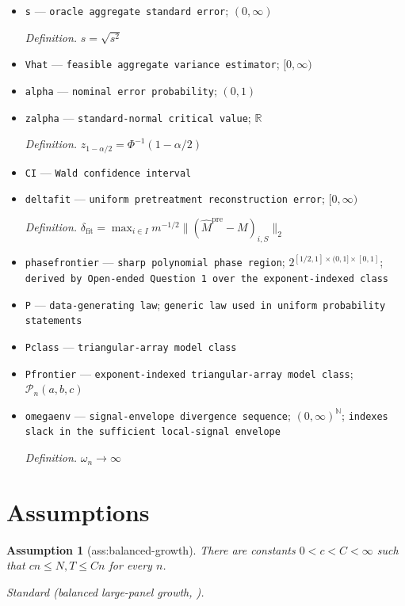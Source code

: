 \documentclass{article}
\newtheorem{assumption}{Assumption}
\begin{document}
\begin{itemize}
  \item \texttt{s} --- \texttt{oracle aggregate standard error}; \((0,\infty)\)
  \par\smallskip\noindent\emph{Definition.} \(s=\sqrt{s^2}\)
  \item \texttt{Vhat} --- \texttt{feasible aggregate variance estimator}; \([0,\infty)\)
  \item \texttt{alpha} --- \texttt{nominal error probability}; \((0,1)\)
  \item \texttt{zalpha} --- \texttt{standard-\allowbreak{}normal critical value}; \(\mathbb R\)
  \par\smallskip\noindent\emph{Definition.} \(z_{1-\alpha/2}=\Phi^{-1}(1-\alpha/2)\)
  \item \texttt{CI} --- \texttt{Wald confidence interval}
  \item \texttt{deltafit} --- \texttt{uniform pretreatment reconstruction error}; \([0,\infty)\)
  \par\smallskip\noindent\emph{Definition.} \(\delta_{\mathrm{fit}}=\max_{i\in I}m^{-1/2}\|(\widehat M^{\mathrm{pre}}-M)_{i,S}\|_2\)
  \item \texttt{phasefrontier} --- \texttt{sharp polynomial phase region}; \(2^{[1/2,1]\times(0,1]\times[0,1]}\); \texttt{derived by Open-\allowbreak{}ended Question 1 over the exponent-\allowbreak{}indexed class}
  \item \texttt{P} --- \texttt{data-\allowbreak{}generating law}; \texttt{generic law used in uniform probability statements}
  \item \texttt{Pclass} --- \texttt{triangular-\allowbreak{}array model class}
  \item \texttt{Pfrontier} --- \texttt{exponent-\allowbreak{}indexed triangular-\allowbreak{}array model class}; \(\mathcal P_n(a,b,c)\)
  \item \texttt{omegaenv} --- \texttt{signal-\allowbreak{}envelope divergence sequence}; \((0,\infty)^{\mathbb N}\); \texttt{indexes slack in the sufficient local-\allowbreak{}signal envelope}
  \par\smallskip\noindent\emph{Definition.} \(\omega_n\to\infty\)
\end{itemize}

\section{Assumptions}

\begin{assumption}[ass:balanced-growth]\label{ass:balanced-growth}
There are constants \(0<c<C<\infty\) such that \(cn\le N,T\le Cn\) for every \(n\).
\par\smallskip\noindent\emph{Standard} (balanced large-panel growth, \cite{choiYuan2024MNAR}).
\end{assumption}
\end{document}
